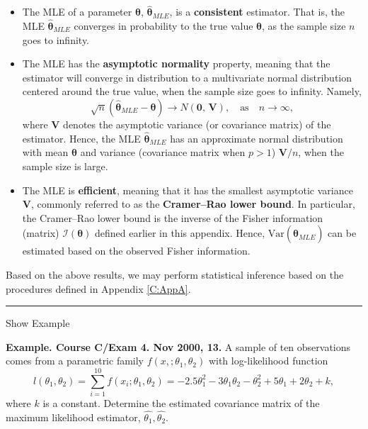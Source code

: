 \documentclass[]{book}
\theoremstyle{definition}
\theoremstyle{definition}
\theoremstyle{definition}
\theoremstyle{remark}
\begin{document}
\begin{itemize}
\item
  The MLE of a parameter \(\boldsymbol{\theta}\),
  \(\hat{\boldsymbol{\theta}}_{MLE}\), is a \textbf{consistent}
  estimator. That is, the MLE \(\hat{\boldsymbol{\theta}}_{MLE}\)
  converges in probability to the true value \(\boldsymbol{\theta}\), as
  the sample size \(n\) goes to infinity.
\item
  The MLE has the \textbf{asymptotic normality} property, meaning that
  the estimator will converge in distribution to a multivariate normal
  distribution centered around the true value, when the sample size goes
  to infinity. Namely,
  \[\sqrt{n}(\hat{\boldsymbol{\theta}}_{MLE}-\boldsymbol{\theta})\rightarrow N\left(\mathbf 0,\,\boldsymbol{V}\right),\quad \mbox{as}\quad n\rightarrow \infty,\]
  where \(\boldsymbol{V}\) denotes the asymptotic variance (or
  covariance matrix) of the estimator. Hence, the MLE
  \(\hat{\boldsymbol{\theta}}_{MLE}\) has an approximate normal
  distribution with mean \(\boldsymbol{\theta}\) and variance
  (covariance matrix when \(p>1\)) \(\boldsymbol{V}/n\), when the sample
  size is large.
\item
  The MLE is \textbf{efficient}, meaning that it has the smallest
  asymptotic variance \(\boldsymbol{V}\), commonly referred to as the
  \textbf{Cramer--Rao lower bound}. In particular, the Cramer--Rao lower
  bound is the inverse of the Fisher information (matrix)
  \(\mathcal{I}(\boldsymbol{\theta})\) defined earlier in this appendix.
  Hence, \(\mathrm{Var}(\hat{\boldsymbol{\theta}}_{MLE})\) can be
  estimated based on the observed Fisher information.
\end{itemize}

Based on the above results, we may perform statistical inference based
on the procedures defined in Appendix \ref{C:AppA}.

\begin{center}\rule{0.5\linewidth}{\linethickness}\end{center}

Show Example

\hypertarget{EXM:S2b:COV}{}
\textbf{Example. Course C/Exam 4. Nov 2000, 13.} A sample of ten
observations comes from a parametric family
\(f(x,; \theta_1, \theta_2)\) with log-likelihood function
\[l(\theta_1, \theta_2)= \sum_{i=1}^{10} f(x_i; \theta_1, \theta_2) = -2.5 \theta_1^2 - 3
    \theta_1 \theta_2 - \theta_2^2 + 5 \theta_1 + 2 \theta_2 + k,\]
where \(k\) is a constant. Determine the estimated covariance matrix of
the maximum likelihood estimator, \(\hat{\theta_1}, \hat{\theta_2}\).
\end{document}
